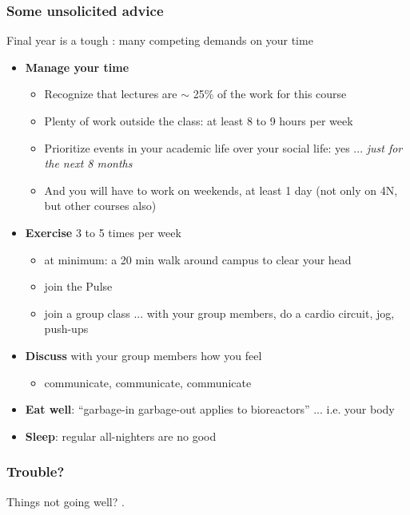 \begin{frame}\frametitle{Some unsolicited advice}
	\begin{exampleblock}{}
		Final year is a tough : many competing demands on your time
	\end{exampleblock}	
	\begin{itemize}		
		\item	\textbf{Manage your time}
		\begin{itemize}
			\item	Recognize that lectures are $\sim$ 25\% of the work for this course
			\item	Plenty of work outside the class: at least 8 to 9 hours per week
			\item	Prioritize events in your academic life over your social life: yes ... \emph{just for the next 8 months}
			\item	And you will have to work on weekends, at least 1 day (not only on 4N, but other courses also)
		\end{itemize}
		\pause
		\item	\textbf{Exercise} 3 to 5 times per week
		\begin{itemize}
			\item	at minimum: a 20 min walk around campus to clear your head
			\item	join the Pulse
			\item	join a group class ... with your group members, do a cardio circuit, jog, push-ups
		\end{itemize}		
		\pause
		\item	\textbf{Discuss} with your group members how you feel
		\begin{itemize}
			\item	communicate, communicate, communicate
		\end{itemize}
		\item	\textbf{Eat well}: ``garbage-in garbage-out applies to bioreactors'' ... i.e. your body
		\item	\textbf{Sleep}: regular all-nighters are no good
	\end{itemize}	
\end{frame}

\begin{frame}\frametitle{Trouble?}
	\begin{exampleblock}{}
		\vspace{12pt}
		Things not going well? {}.
		\vspace{12pt}
	\end{exampleblock}
\end{frame}


